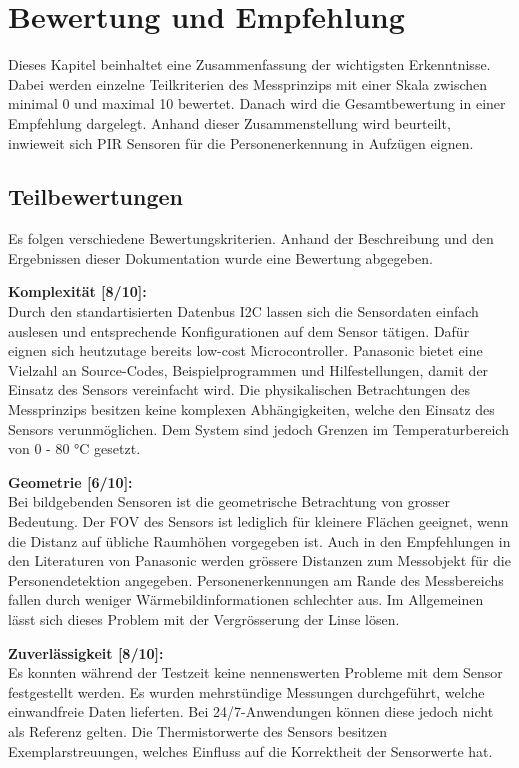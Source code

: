 \chapter{Bewertung und Empfehlung}
\label{Empfehlung_Vorgehen}

Dieses Kapitel beinhaltet eine Zusammenfassung der wichtigsten Erkenntnisse. Dabei werden einzelne Teilkriterien des Messprinzips mit einer Skala zwischen minimal 0 und maximal 10  bewertet. Danach wird die Gesamtbewertung in einer Empfehlung dargelegt. Anhand dieser Zusammenstellung wird beurteilt, inwieweit sich PIR Sensoren für die Personenerkennung in Aufzügen eignen. 

\section{Teilbewertungen}
\label{sec:Teilbewertung}

Es folgen verschiedene Bewertungskriterien. Anhand der Beschreibung und den Ergebnissen dieser Dokumentation wurde eine Bewertung abgegeben.

\textbf{Komplexität [8/10]:} \\
Durch den standartisierten Datenbus \ac{I2C} lassen sich die Sensordaten einfach auslesen und entsprechende Konfigurationen auf dem Sensor tätigen. Dafür eignen sich heutzutage bereits low-cost Microcontroller. Panasonic bietet eine Vielzahl an Source-Codes, Beispielprogrammen und Hilfestellungen, damit der Einsatz des Sensors vereinfacht wird. Die physikalischen Betrachtungen des Messprinzips besitzen keine komplexen Abhängigkeiten, welche den Einsatz des Sensors verunmöglichen. Dem System sind jedoch Grenzen im Temperaturbereich von 0 - 80 °C gesetzt.

\textbf{Geometrie [6/10]:} \\
Bei bildgebenden Sensoren ist die geometrische Betrachtung von grosser Bedeutung. Der \ac{FOV} des Sensors ist lediglich für kleinere Flächen geeignet, wenn die Distanz auf übliche Raumhöhen vorgegeben ist. Auch in den Empfehlungen in den Literaturen von Panasonic werden grössere Distanzen zum Messobjekt für die Personendetektion angegeben. Personenerkennungen am Rande des Messbereichs fallen durch weniger Wärmebildinformationen schlechter aus. Im Allgemeinen lässt sich dieses Problem mit der Vergrösserung der Linse lösen.

\textbf{Zuverlässigkeit [8/10]:} \\
Es konnten während der Testzeit keine nennenswerten Probleme mit dem Sensor festgestellt werden. Es wurden mehrstündige Messungen durchgeführt, welche einwandfreie Daten lieferten. Bei 24/7-Anwendungen können diese jedoch nicht als Referenz gelten. Die Thermistorwerte des Sensors besitzen Exemplarstreuungen, welches Einfluss auf die Korrektheit der Sensorwerte hat.
  
